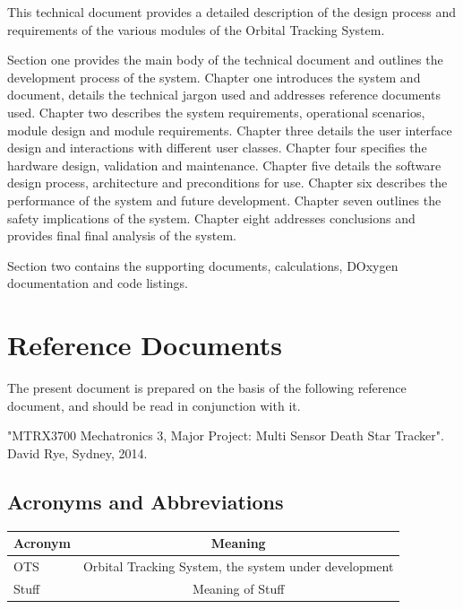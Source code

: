 \documentclass[]{report}
\begin{document}
This technical document provides a detailed description of the design process and requirements of the various modules of the Orbital Tracking System. \newline

Section one provides the main body of the technical document and outlines the development process of the system.\newline
Chapter one introduces the system and document, details the technical jargon used and addresses reference documents used. \newline
Chapter two describes the system requirements, operational scenarios, module design and module requirements. \newline
Chapter three details the user interface design and interactions with different user classes. \newline
Chapter four specifies the hardware design, validation and maintenance. \newline
Chapter five details the software design process, architecture and preconditions for use. \newline
Chapter six describes the performance of the system and future development. \newline
Chapter seven outlines the safety implications of the system. \newline
Chapter eight addresses conclusions and provides final final analysis of the system. \newline

Section two contains the supporting documents, calculations, DOxygen documentation and code listings.

\section{Reference Documents}
The present document is prepared on the basis of the following reference document, and should be read in conjunction with it.\newline 

"MTRX3700 Mechatronics 3, Major Project: Multi Sensor Death Star Tracker".  David Rye, Sydney, 2014.

\subsection{Acronyms and Abbreviations}

\begin{center}
	\begin{tabular}{| l | c |}
		\hline
		Acronym & Meaning \\ \hline \hline
		OTS & Orbital Tracking System, the system under development \\ \hline
		Stuff & Meaning of Stuff \\
		\hline
	\end{tabular}
\end{center}
\end{document}
